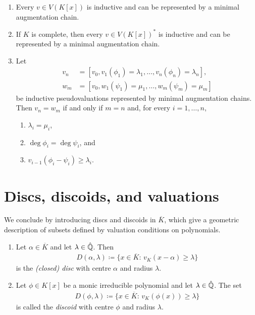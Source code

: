 \begin{theorem}\label{thm:minimal-augmentation-chains}
    \begin{enumerate}[label=\textup{(\roman*)}]
        \item Every $v\in V(K[x])$ is inductive and can be represented by a minimal augmentation chain.
        \item If $K$ is complete, then every $v\in V(K[x])^*$ is inductive and can be represented by a minimal augmentation chain.
        \item Let
        \begin{align*}
            v_n&=[v_0,v_1(\phi_1)=\lambda_1,\dots,v_n(\phi_n)=\lambda_n],\\
            w_m&=[v_0,w_1(\psi_1)=\mu_1,\dots,w_m(\psi_m)=\mu_m]
        \end{align*}
        be inductive pseudovaluations represented by minimal augmentation chains.
        Then $v_n=w_m$ if and only if $m=n$ and, for every $i=1,\dots,n$,
        \begin{enumerate}[label=\textup{(\alph*)}]
            \item $\lambda_i=\mu_i$,
            \item $\deg\phi_i=\deg\psi_i$, and
            \item $v_{i-1}(\phi_i-\psi_i)\geq\lambda_i$.
        \end{enumerate}
    \end{enumerate}
\end{theorem}

\section{Discs, discoids, and valuations}\label{sec:discs-discoids-and-valuations}
We conclude by introducing discs and discoids in $\overline K$, which give a geometric description of subsets defined by valuation conditions on polynomials.

\begin{definition}
    \begin{enumerate}[label=\textup{(\alph*)}]
        \item Let $\alpha \in \overline K$ and let $\lambda \in \hat{\mathbb Q}$.
            Then
                \begin{align}
                    D(\alpha, \lambda) \coloneqq \lbrace x \in \overline K:\, v_K(x - \alpha) \geq \lambda\rbrace
                \end{align}
            is the \textit{(closed) disc} with centre $\alpha$ and radius $\lambda$.
        \item Let $\phi \in K[x]$ be a monic irreducible polynomial and let $\lambda \in \hat{\mathbb Q}$.
            The set
            \begin{align}
                D(\phi, \lambda) \coloneqq \lbrace x \in \overline K:\, v_K(\phi(x)) \geq \lambda \rbrace
            \end{align}
            is called the \textit{discoid} with centre $\phi$ and radius $\lambda$.
    \end{enumerate}
\end{definition}

